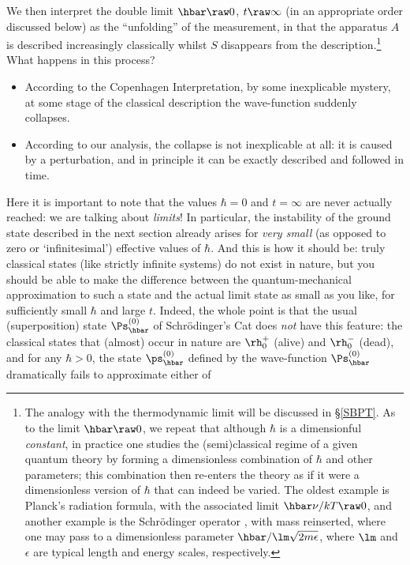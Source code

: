 \documentclass[12pt]{article}
\begin{document}
\noindent We then
 interpret the double limit $\hbar\raw 0$, $t\raw\infty$  (in  an appropriate order discussed below) as the ``unfolding'' of the  measurement, in that  the apparatus $A$ is described increasingly classically whilst $S$ disappears from the description.\footnote{The analogy with the thermodynamic limit  will be discussed in  \S\ref{SBPT}.
As to the limit $\hbar\raw 0$, we repeat \cite[pp.\ 471--472] {handbook} that although  $\hbar$ is a dimensionful  \emph{constant}, in practice one studies the (semi)classical regime of a given quantum theory by forming a dimensionless combination of $\hbar$ and other parameters; this combination then re-enters the theory as if it were a dimensionless version of  $\hbar$ that can indeed be varied. The oldest example is Planck's radiation formula, with the associated limit $\hbar\nu/kT\raw 0$, and 
another example is the Schr\"{o}dinger operator , with mass reinserted, where  one may pass to a dimensionless parameter $\hbar/\lm\sqrt{2m\epsilon}$,
where $\lm$ and  $\epsilon$ are typical length and energy scales, respectively.}
What happens in this process?
 \begin{itemize}
\item  According to the Copenhagen Interpretation, by some inexplicable mystery, at some stage of the classical description  the wave-function suddenly collapses.
\item According to our analysis, the collapse is not inexplicable at all: it  is caused by a perturbation, and  in principle it can be exactly described and followed in time.
\end{itemize}
Here it  is important to note that the values $\hbar=0$ and $t=\infty$ are never actually reached: we are talking about \emph{limits}! In particular, the instability of the ground state described in the next section already arises for \emph{very small} (as opposed to zero or `infinitesimal') effective values of $\hbar$. And this is how it should be: truly classical states (like strictly infinite systems) do not exist in nature, but you should be able to make the difference between
 the quantum-mechanical approximation to such a state and the actual limit state
 as small as you like,  for sufficiently small $\hbar$ 
 and  large $t$.
Indeed, the whole point  is that 
the usual (superposition) state $\Ps^{(0)}_{\hbar}$ of Schr\"{o}dinger's Cat does \emph{not} have this feature: the classical states that (almost) occur in nature are $\rh_0^+$ (alive) and  $\rh_0^-$ (dead), and for any $\hbar>0$, the state  $\ps^{(0)}_{\hbar}$ defined by the wave-function $\Ps^{(0)}_{\hbar} $ dramatically fails to approximate either of
\end{document}
